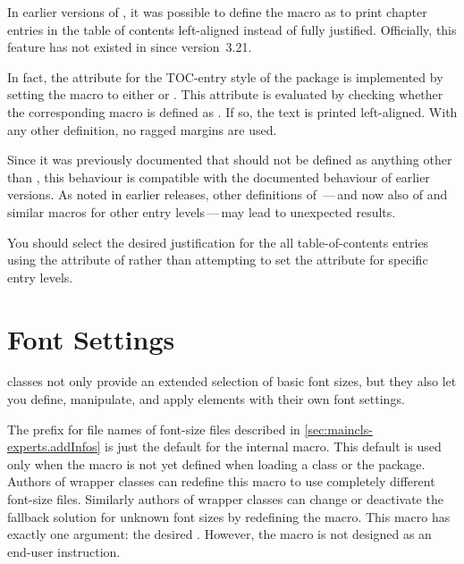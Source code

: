\begin{Declaration}
\end{Declaration}
In earlier versions of
\KOMAScript{}, it was possible to define the  macro
as  to print chapter entries in the table of contents
left-aligned instead of fully justified. Officially, this feature has not
existed in \KOMAScript{} since version~3.21.

In fact, the  attribute for the 
TOC-entry style of the  package is
implemented by setting the  macro to
either  or . This attribute is evaluated by
checking whether the corresponding macro is defined as . If
so, the text is printed left-aligned. With any other definition, no ragged
margins are used.

Since it was previously documented that  should not
be defined as anything other than , this behaviour is
compatible with the documented behaviour of earlier versions. As noted in
earlier releases, other definitions of \,---\,and
now also of  and similar macros for other entry
levels\,---\,may lead to unexpected results.

You should select the desired justification for the all table-of-contents
entries using the  attribute of 
rather than attempting to set the attribute for specific entry levels.%
\EndIndexGroup


\section{Font Settings}

\KOMAScript{} classes not only provide an extended selection of basic font
sizes, but they also let you define, manipulate, and apply elements with
their own font settings.

\begin{Declaration}
\end{Declaration}
The  prefix for file names of font-size files described
in \autoref{sec:maincls-experts.addInfos} is just the default for the
internal  macro. This
default is used only when the macro is not yet defined when loading a
\KOMAScript{} class or the  package. Authors of wrapper
classes can redefine this macro to use completely different font-size files.
Similarly authors of wrapper classes can change or deactivate
the fallback solution for unknown font sizes by redefining the
 macro. This macro
has exactly one argument: the desired .
However, the  macro is not
designed as an end-user instruction.%
\EndIndexGroup


